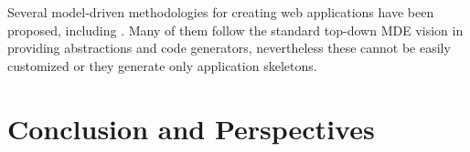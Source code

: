\documentclass[runningheads,a4paper]{llncs}
\begin{document}
Several model-driven methodologies for creating web applications have been proposed, including
\cite{schwabe1996systematic,lima2003modeling,ceri2000web,koch2001authoring,pastor2003oows,valverde2007mda,vdovjak2003engineering,kraus2007model,nunes2006rapid,brambilla2008designing,valderas2007transformational,van2006hera,Groenewegen08_WebDSL}.
Many of them follow the standard top-down MDE vision in providing abstractions and code generators, nevertheless
these cannot be easily customized or they generate only application skeletons.



\section{Conclusion and Perspectives}




\end{document}

